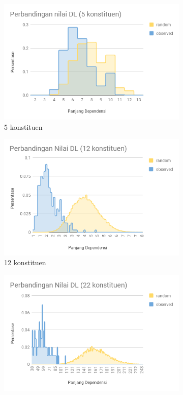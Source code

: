 \begin{figure}
\centering

\begin{subfigure}{.45\textwidth}
  \centering
  \includegraphics[width=1\linewidth]{pics/l5randomobs.png}
  \caption{5 konstituen}
  \label{fig:l5randomobs} 
\end{subfigure}
%
\begin{subfigure}{.45\textwidth}
  \centering
  \includegraphics[width=1\linewidth]{pics/l12randomobs.png}
  \caption{12 konstituen}
  \label{fig:l12randomobs} 
\end{subfigure}
%
\begin{subfigure}{.45\textwidth}
  \centering
  \includegraphics[width=1\linewidth]{pics/l22randomobs.png}

\end{subfigure}
\end{figure}
